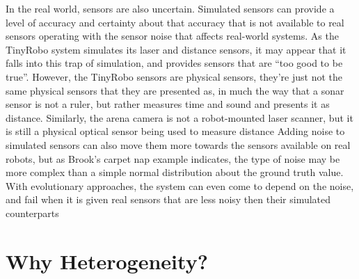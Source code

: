 In the real world, sensors are also uncertain. 
Simulated sensors can provide a level of accuracy and certainty about that accuracy that is not available to real sensors operating with the sensor noise that affects real-world systems. 
As the TinyRobo system simulates its laser and distance sensors, it may appear that it falls into this trap of simulation, and provides sensors that are ``too good to be true''. 
However, the TinyRobo sensors are physical sensors, they're just not the same physical sensors that they are presented as, in much the way that a sonar sensor is not a ruler, but rather measures time and sound and presents it as distance. 
Similarly, the arena camera is not a robot-mounted laser scanner, but it is still a physical optical sensor being used to measure distance
Adding noise to simulated sensors can also move them more towards the sensors available on real robots, but as Brook's carpet nap example indicates, the type of noise may be more complex than a simple normal distribution about the ground truth value. 
With evolutionary approaches, the system can even come to depend on the noise, and fail when it is given real sensors that are less noisy then their simulated counterparts \citep{jakobi1995noise} 
%
%

\section{Why Heterogeneity?}

